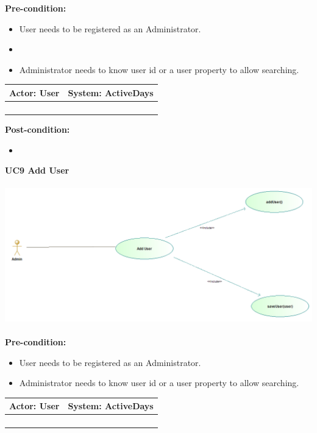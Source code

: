 \documentclass[11pt]{article}
\begin{document}
\textbf{Pre-condition: }   \\
\begin{itemize}
	\item User needs to be registered as an Administrator.
	\item \item Administrator needs to know user id or a user property to allow searching. 
\end{itemize}
\begin{center}
	\begin{tabular}{ |p{8cm}|p{8cm}| }
		\hline
		\textbf{Actor:} User & \textbf{System:} ActiveDays \\
		\hline
		&  \\
		\hline
		&  \\
		\hline
		& \\   
		\hline
		& \\
		\hline
	\end{tabular}
\end{center}		
\textbf{Post-condition: } \\
\begin{itemize}
	\item 
\end{itemize}
\textbf{UC9 Add User}\\\\
\includegraphics[scale=0.5]{./DiagramsTshepo/addUser.png}\\\\
\textbf{Pre-condition: }   \\
\begin{itemize}
	\item User needs to be registered as an Administrator.
	\item Administrator needs to know user id or a user property to allow searching. 
\end{itemize}
\begin{center}
	\begin{tabular}{ |p{8cm}|p{8cm}| }
		\hline
		\textbf{Actor:} User & \textbf{System:} ActiveDays \\
		\hline
		&  \\
		\hline
		&  \\
		\hline
		& \\   
		\hline
		& \\
		\hline
	\end{tabular}
\end{center}		
\end{document}

